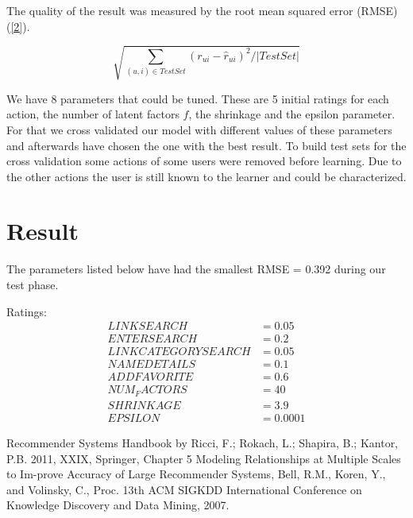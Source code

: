 \documentclass[pdftex,a4paper,11pt]{article}
\begin{document}
The quality of the result was measured by the root mean squared error (RMSE) (\ref{2}).
 
\begin{equation} \label{2} \sqrt{ \sum_{(u,i) \in TestSet} (r_{u i} - \hat{r}_{u i} ) ^2 / \left| TestSet \right| } \end{equation}

We have 8 parameters that could be tuned. These are 5 initial ratings for each action, the number of latent factors $ f $, the shrinkage and the epsilon parameter. For that we cross validated our model with different values of these parameters and afterwards have chosen the one with the best result. To build test sets for the cross validation some actions of some users were removed before learning. Due to the other actions the user is still known to the learner and could be characterized.

\section{Result}
The parameters listed below have had the smallest RMSE = 0.392 during our test phase.

Ratings:\\
\begin{align*}
LINK SEARCH &= 0.05\\
ENTER SEARCH &= 0.2\\
LINK CATEGORY SEARCH &= 0.05\\
NAME DETAILS &= 0.1\\
ADD FAVORITE &= 0.6\\
NUM_FACTORS &= 40\\
SHRINKAGE &= 3.9\\
EPSILON &= 0.0001
\end{align*}



\begin{thebibliography}{99}
 Recommender Systems Handbook by Ricci, F.; Rokach, L.; Shapira, B.; Kantor, P.B. 2011, XXIX, Springer,  Chapter 5
  Modeling Relationships at Multiple Scales to Im-prove Accuracy of Large Recommender Systems, Bell, R.M., Koren, Y., and Volinsky, C., Proc. 13th ACM SIGKDD International
Conference on Knowledge Discovery and Data Mining, 2007.
\end{thebibliography}
\nocite{*}


\end{document}
